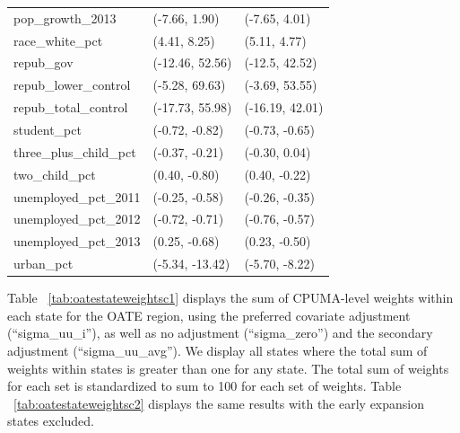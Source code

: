 \documentclass[aoas]{imsart}
\theoremstyle{plain}
\theoremstyle{remark}
\begin{document}
\begin{appendix}
\begin{table}[ht]
\begin{tabular}{lll}
  pop\_growth\_2013 & (-7.66, 1.90) & (-7.65, 4.01) \\ 
  race\_white\_pct & (4.41, 8.25) & (5.11, 4.77) \\ 
  repub\_gov & (-12.46, 52.56) & (-12.5, 42.52) \\ 
  repub\_lower\_control & (-5.28, 69.63) & (-3.69, 53.55) \\ 
  repub\_total\_control & (-17.73, 55.98) & (-16.19, 42.01) \\ 
  student\_pct & (-0.72, -0.82) & (-0.73, -0.65) \\ 
  three\_plus\_child\_pct & (-0.37, -0.21) & (-0.30, 0.04) \\ 
  two\_child\_pct & (0.40, -0.80) & (0.40, -0.22) \\ 
  unemployed\_pct\_2011 & (-0.25, -0.58) & (-0.26, -0.35) \\ 
  unemployed\_pct\_2012 & (-0.72, -0.71) & (-0.76, -0.57) \\ 
  unemployed\_pct\_2013 & (0.25, -0.68) & (0.23, -0.50) \\ 
  urban\_pct & (-5.34, -13.42) & (-5.70, -8.22) \\ 
   \hline
\end{tabular}
\end{table}

Table ~\ref{tab:oatestateweightsc1} displays the sum of CPUMA-level weights within each state for the OATE region, using the preferred covariate adjustment (``sigma\_uu\_i''), as well as no adjustment (``sigma\_zero'') and the secondary adjustment (``sigma\_uu\_avg''). We display all states where the total sum of weights within states is greater than one for any state. The total sum of weights for each set is standardized to sum to 100 for each set of weights. Table ~\ref{tab:oatestateweightsc2} displays the same results with the early expansion states excluded.


\end{appendix}
\end{document}
